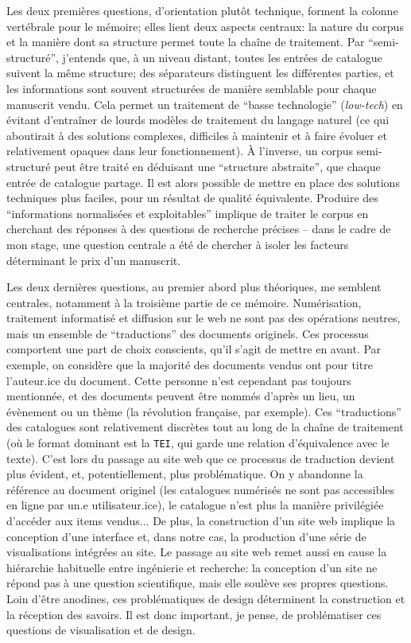 \documentclass[a4paper, 12pt, twoside]{book}
\newcommand{\tei}{\texttt{TEI}}
\begin{document}
Les deux premières questions, d'orientation plutôt technique, forment la colonne vertébrale pour le mémoire; elles lient deux aspects centraux: la nature du corpus et la manière dont sa structure permet toute la chaîne de traitement. Par \enquote{semi-structuré}, j'entends que, à un niveau distant, toutes les entrées de catalogue suivent la même structure; des séparateurs distinguent les différentes parties, et les informations sont souvent structurées de manière semblable pour chaque manuscrit vendu. Cela permet un traitement de \enquote{basse technologie} (\emph{low-tech}) en évitant d'entraîner de lourds modèles de traitement du langage naturel (ce qui aboutirait à des solutions complexes, difficiles à maintenir et à faire évoluer et relativement opaques dans leur fonctionnement). À l'inverse, un corpus semi-structuré peut être traité en déduisant une \enquote{structure abstraite}, que chaque entrée de catalogue partage. Il est alors possible de mettre en place des solutions techniques plus faciles, pour un résultat de qualité équivalente. Produire des \enquote{informations normalisées et exploitables} implique de traiter le corpus en cherchant des réponses à des questions de recherche précises -- dans le cadre de mon stage, une question centrale a été de chercher à isoler les facteurs déterminant le prix d'un manuscrit.

Les deux dernières questions, au premier abord plus théoriques, me semblent centrales, notamment à la troisième partie de ce mémoire. Numérisation, traitement informatisé et diffusion sur le web ne sont pas des opérations neutres, mais un ensemble de \enquote{traductions} des documents originels. Ces processus comportent une part de choix conscients, qu'il s'agit de mettre en avant. Par exemple, on considère que la majorité des documents vendus ont pour titre l'auteur.ice du document. Cette personne n'est cependant pas toujours mentionnée, et des documents peuvent être nommés d'après un lieu, un évènement ou un thème (la révolution française, par exemple). Ces \enquote{traductions} des catalogues sont relativement discrètes tout au long de la chaîne de traitement (où le format dominant est la \tei{}, qui garde une relation d'équivalence avec le texte). C'est lors du  passage au site web que ce processus de traduction devient plus évident, et, potentiellement, plus problématique. On y abandonne la référence au document originel (les catalogues numérisés ne sont pas accessibles en ligne par un.e utilisateur.ice), le catalogue n'est plus la manière privilégiée d'accéder aux items vendus... De plus, la construction d'un site web implique la conception d'une interface et, dans notre cas, la production d'une série de visualisations intégrées au site. Le passage au site web remet aussi en cause la hiérarchie habituelle entre ingénierie et recherche: la conception d'un site ne répond pas à une question scientifique, mais elle soulève ses propres questions. Loin d'être anodines, ces problématiques de design déterminent la construction et la réception des savoirs. Il est donc important, je pense, de problématiser ces questions de visualisation et de design.
\end{document}
